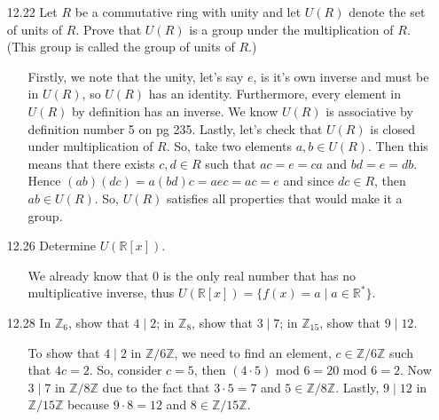 \documentclass[12pt]{article}
\begin{document}
\begin{enumerate}
\item[12.22] Let $R$ be a commutative ring with unity and let $U(R)$ denote the set of units of $R$. Prove that 
$U(R)$ is a group under the multiplication of $R$. (This group is called the group of units of $R$.)
\begin{enumerate}
\item[] Firstly, we note that the unity, let's say $e$, is it's own inverse and must be in $U(R)$, so $U(R)$ has an identity. 
Furthermore, every element in $U(R)$ by definition has an inverse. We know $U(R)$ is associative by definition number
5 on pg 235. Lastly, let's check that $U(R)$ is closed under multiplication of $R$. So, take two elements $a, b \in U(R)$.
Then this means that there exists $c, d \in R$ such that $ac = e = ca$ and $bd = e = db$. Hence 
$(ab)(dc) = a(bd)c = aec = ac = e$ and since $dc \in R$, then $ab \in U(R)$. So, $U(R)$ satisfies all properties that
would make it a group.
\end{enumerate}

\item[12.26] Determine $U(\mathbb{R}[x])$.
\begin{enumerate}
\item[] We already know that $0$ is the only real number that has no multiplicative inverse, thus
$U(\mathbb{R}[x]) = \{ f(x) = a \mid a \in \mathbb{R}^* \}$.
\end{enumerate}

\item[12.28] In $\mathbb{Z}_6$, show that $4 \mid 2$; in $\mathbb{Z}_8$, show that $3 \mid 7$;
in $\mathbb{Z}_{15}$, show that $9 \mid 12$.
\begin{enumerate}
\item[] To show that $4 \mid 2$ in $\mathbb{Z}/6\mathbb{Z}$, we need to find an element, $c \in 
\mathbb{Z}/6\mathbb{Z}$ such that $4c = 2$. So, consider $c = 5$, then $(4 \cdot 5) $ mod $6 = 20$ mod $6 = 2$.
Now $3 \mid 7$ in $\mathbb{Z}/8\mathbb{Z}$ due to the fact that $3 \cdot 5 = 7$ and $5 \in \mathbb{Z}/8\mathbb{Z}$.
Lastly, $9 \mid 12$ in $\mathbb{Z}/15\mathbb{Z}$ because $9 \cdot 8 = 12$ and $8 \in 
\mathbb{Z}/15\mathbb{Z}$.
\end{enumerate}


\end{enumerate}
\end{document}
